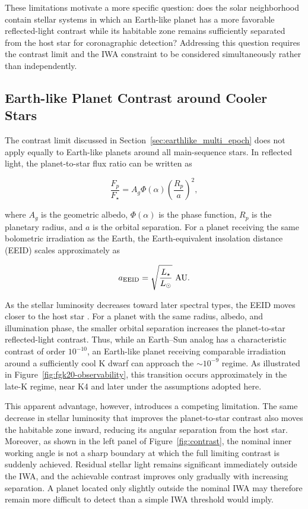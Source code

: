 These limitations motivate a more specific question: does the solar
neighborhood contain stellar systems in which an Earth-like planet has a more
favorable reflected-light contrast while its habitable zone remains
sufficiently separated from the host star for coronagraphic detection?
Addressing this question requires the contrast limit and the IWA constraint to
be considered simultaneously rather than independently.


\subsection{Earth-like Planet Contrast around Cooler Stars}
\label{sec:earthlike_contrast}

The contrast limit discussed in Section~\ref{sec:earthlike_multi_epoch} does not apply equally to Earth-like planets around all main-sequence stars. In reflected light, the planet-to-star flux ratio can be written as \cite{traub10}

\begin{equation}
\frac{F_p}{F_\star}
=
A_g \Phi(\alpha)
\left(\frac{R_p}{a}\right)^2 ,
\label{eq:reflected_contrast}
\end{equation}

where $A_g$ is the geometric albedo, $\Phi(\alpha)$ is the phase function,
$R_p$ is the planetary radius, and $a$ is the orbital separation. For a
planet receiving the same bolometric irradiation as the Earth, the
Earth-equivalent insolation distance (EEID) scales approximately as \cite{kopparapu13,kopparapu14}

\begin{equation}
a_{\rm EEID}
=
\sqrt{\frac{L_\star}{L_\odot}}\ {\rm AU}.
\label{eq:eeid}
\end{equation}

As the stellar luminosity decreases toward later spectral types, the EEID
moves closer to the host star \cite{kopparapu13}. For a planet with the same radius, 
albedo, and illumination phase, the smaller orbital separation increases the
planet-to-star reflected-light contrast. Thus, while an Earth--Sun analog has
a characteristic contrast of order $10^{-10}$, an Earth-like planet receiving
comparable irradiation around a sufficiently cool K dwarf can approach the
$\sim10^{-9}$ regime. As illustrated in Figure~\ref{fig:fgk20-observability}, 
this transition occurs approximately in the late-K regime, near K4 and later
under the assumptions adopted here.

This apparent advantage, however, introduces a competing limitation. The same
decrease in stellar luminosity that improves the planet-to-star contrast also
moves the habitable zone inward, reducing its angular separation from the
host star. Moreover, as shown in the left panel of Figure~\ref{fig:contrast}, 
the nominal inner working angle is not a sharp boundary at which the full limiting
contrast is suddenly achieved. Residual stellar light remains significant
immediately outside the IWA, and the achievable contrast improves only
gradually with increasing separation. A planet located only slightly outside
the nominal IWA may therefore remain more difficult to detect than a simple
IWA threshold would imply.


